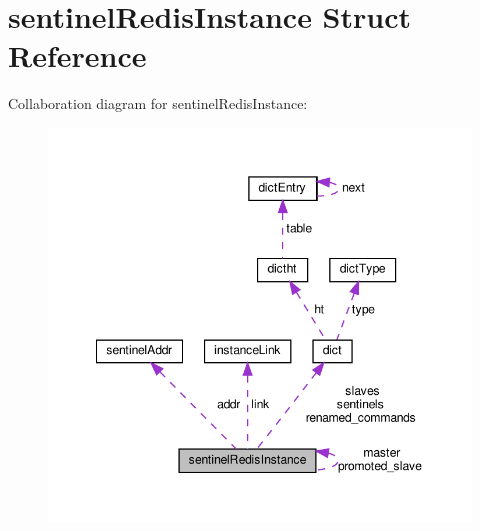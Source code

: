 \hypertarget{structsentinel_redis_instance}{}\section{sentinel\+Redis\+Instance Struct Reference}
\label{structsentinel_redis_instance}


Collaboration diagram for sentinel\+Redis\+Instance\+:
\nopagebreak
\begin{figure}[H]
\begin{center}
\leavevmode
\includegraphics[width=349pt]{structsentinel_redis_instance__coll__graph}
\end{center}
\end{figure}
